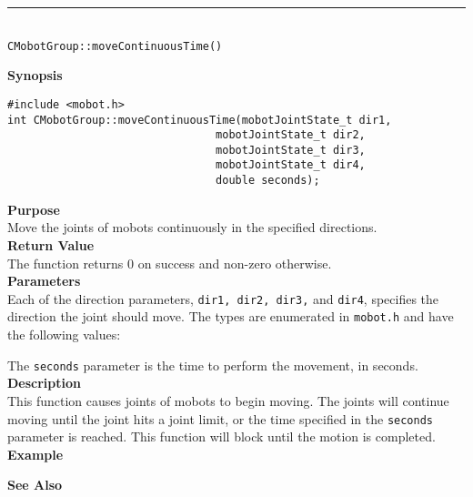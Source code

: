 \noindent
\vspace{5pt}
\rule{4.5in}{0.015in}\\
\noindent
{\LARGE \texttt{CMobotGroup::moveContinuousTime()}}\\
{}

\noindent
{\bf Synopsis}
\vspace{-8pt}
\begin{verbatim}
#include <mobot.h>
int CMobotGroup::moveContinuousTime(mobotJointState_t dir1, 
                                mobotJointState_t dir2, 
                                mobotJointState_t dir3, 
                                mobotJointState_t dir4, 
                                double seconds);
\end{verbatim}

\noindent
{\bf Purpose}\\
Move the joints of mobots continuously in the specified directions.\\

\noindent
{\bf Return Value}\\
The function returns 0 on success and non-zero otherwise.\\

\noindent
{\bf Parameters}\\
Each of the direction parameters, \texttt{dir1, dir2, dir3,} and \texttt{dir4}, specifies the direction the joint should move. The types
are enumerated in \texttt{mobot.h} and have the following values:

The \texttt{seconds} parameter is the time to perform the movement, in seconds.
\\

\noindent
{\bf Description}\\
This function causes joints of mobots to begin moving. The joints will continue moving
until the joint hits a joint limit, or the time specified in the \texttt{seconds} parameter
is reached. This function will block until the motion is completed.\\

\noindent
{\bf Example}\\
\noindent

\noindent
{\bf See Also}\\

